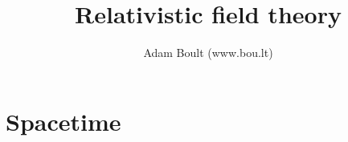 \documentclass[oneside]{book}
\begin{document}
\author{Adam Boult (www.bou.lt)}
\title{Relativistic field theory}
\maketitle

\setcounter{tocdepth}{0}
\tableofcontents



\part{Spacetime}

\end{document}
